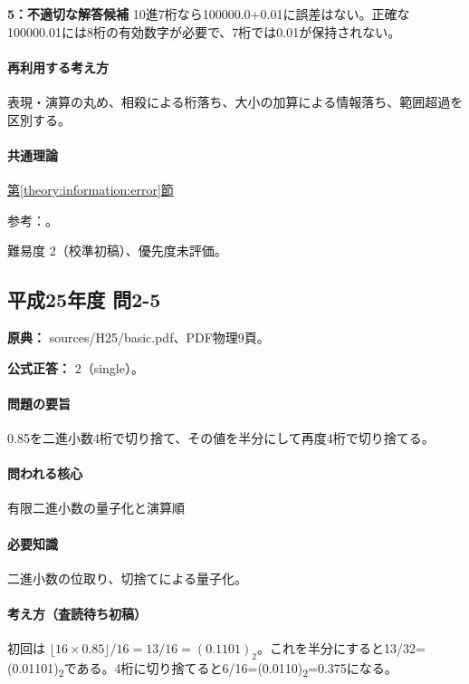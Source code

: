 \noindent\textbf{5：不適切な解答候補} 10進7桁なら100000.0+0.01に誤差はない。正確な100000.01には8桁の有効数字が必要で、7桁では0.01が保持されない。\par

\paragraph{再利用する考え方} 表現・演算の丸め、相殺による桁落ち、大小の加算による情報落ち、範囲超過を区別する。

\paragraph{共通理論} \hyperref[theory:information:error]{第\ref*{theory:information:error}節}

\par 参考：\cite{goldberg1991}。

\par 難易度 2（校準初稿）、優先度未評価。

\subsection{平成25年度 問2-5}
\label{q:h25-reg-basic-2-5}

\noindent\textbf{原典：} sources/H25/basic.pdf、PDF物理9頁。

\textbf{公式正答：} 2（single）。

\paragraph{問題の要旨} 0.85を二進小数4桁で切り捨て、その値を半分にして再度4桁で切り捨てる。

\paragraph{問われる核心} 有限二進小数の量子化と演算順

\paragraph{必要知識} 二進小数の位取り、切捨てによる量子化。

\paragraph{考え方（査読待ち初稿）} 初回は \(\lfloor16\times0.85\rfloor/16=13/16=(0.1101)_2\)。これを半分にすると13/32=(0.01101)\textsubscript{2}である。4桁に切り捨てると6/16=(0.0110)\textsubscript{2}=0.375になる。

